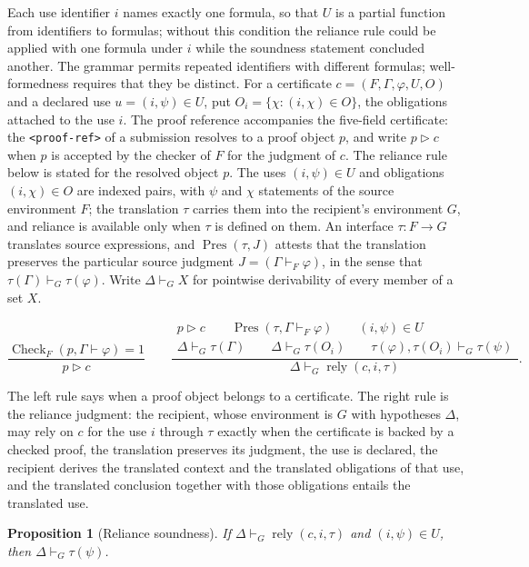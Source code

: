 \documentclass[11pt]{book}
\newtheorem{proposition}[theorem]{Proposition}
\theoremstyle{definition}
\theoremstyle{remark}
\begin{document}
Each use identifier $i$ names exactly one formula, so that $U$ is a partial function from identifiers to formulas; without this condition the reliance rule could be applied with one formula under $i$ while the soundness statement concluded another. The grammar permits repeated identifiers with different formulas; well-formedness requires that they be distinct. For a certificate $c=(F,\Gamma,\varphi,U,O)$ and a declared use $u=(i,\psi)\in U$, put $O_i=\{\chi:(i,\chi)\in O\}$, the obligations attached to the use $i$. The proof reference accompanies the five-field certificate: the \texttt{<proof-ref>} of a submission resolves to a proof object $p$, and write $p\triangleright c$ when $p$ is accepted by the checker of $F$ for the judgment of $c$. The reliance rule below is stated for the resolved object $p$. The uses $(i,\psi)\in U$ and obligations $(i,\chi)\in O$ are indexed pairs, with $\psi$ and $\chi$ statements of the source environment $F$; the translation $\tau$ carries them into the recipient's environment $G$, and reliance is available only when $\tau$ is defined on them. An interface $\tau\colon F\to G$ translates source expressions, and $\operatorname{Pres}(\tau,J)$ attests that the translation preserves the particular source judgment $J=(\Gamma\vdash_F\varphi)$, in the sense that $\tau(\Gamma)\vdash_G\tau(\varphi)$. Write $\Delta\vdash_G X$ for pointwise derivability of every member of a set $X$.

\[
\frac{\operatorname{Check}_F(p,\Gamma\vdash\varphi)=1}
     {p\triangleright c}
\qquad
\frac{
\begin{array}{c}
p\triangleright c\qquad
\operatorname{Pres}(\tau,\Gamma\vdash_F\varphi)\qquad
(i,\psi)\in U\\[2pt]
\Delta\vdash_G\tau(\Gamma)\qquad
\Delta\vdash_G\tau(O_i)\qquad
\tau(\varphi),\tau(O_i)\vdash_G\tau(\psi)
\end{array}
}{
\Delta\vdash_G\operatorname{rely}(c,i,\tau)
}.
\]

The left rule says when a proof object belongs to a certificate. The right rule is the reliance judgment: the recipient, whose environment is $G$ with hypotheses $\Delta$, may rely on $c$ for the use $i$ through $\tau$ exactly when the certificate is backed by a checked proof, the translation preserves its judgment, the use is declared, the recipient derives the translated context and the translated obligations of that use, and the translated conclusion together with those obligations entails the translated use.

\begin{proposition}[Reliance soundness]\label{prop:soundness}
If $\Delta\vdash_G\operatorname{rely}(c,i,\tau)$ and $(i,\psi)\in U$, then $\Delta\vdash_G\tau(\psi)$.
\end{proposition}
\end{document}
